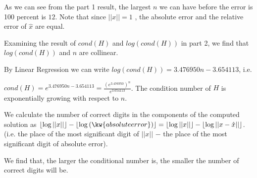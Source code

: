 \documentclass[11pt, answers]{exam}
\theoremstyle{plain}
\theoremstyle{definition}
\begin{document}
\begin{questions}
\question %
As we can see from the part 1 result, the largest $n$ we can have before the error is 100 percent is $12$. Note that since $||x||=1$ , the absolute error and the relative error of $\hat{x}$ are equal.

Examining the result of $cond(H)$ and $log(cond(H))$ in part 2, we find that $log(cond(H))$ and $n$ are collinear. 

By Linear Regression we can write $log(cond(H)) = 3.476950n-3.654113$, i.e. 

$cond(H) = e^{3.476950n-3.654113} = \frac{(e^{3.476950})^n}{e^{3.654113}}$. The condition number of $H$ is exponentially growing with respect to $n$.

We calculate the number of correct digits in the components of the computed solution as $\lfloor\log{||x||}\rfloor - \lfloor\log{(\kw{absolute error})}\rfloor = \lfloor\log{||x||}\rfloor - \lfloor\log{||x-\hat{x}||}\rfloor$. (i.e. the place of the most significant digit of $||x||$ $-$ the place of the most significant digit of absolute error).

We find that, the larger the conditional number is, the smaller the number of correct digits will be.


\end{questions}
\end{document}
